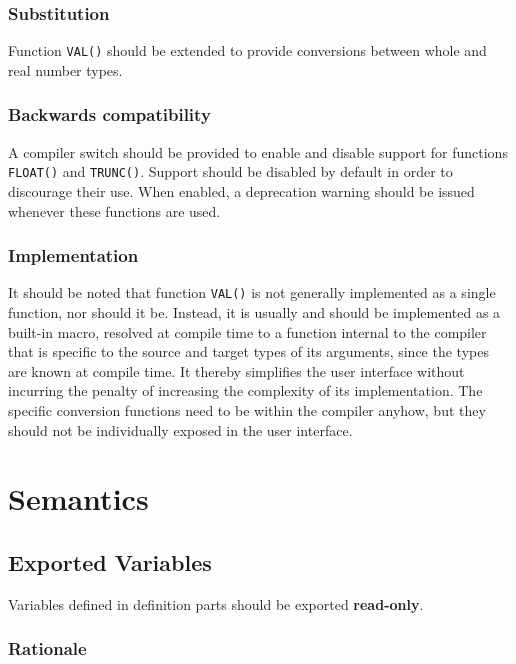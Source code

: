 \documentclass[10pt,a4paper]{article} %
\begin{document}
\subsubsection{Substitution}

Function \verb|VAL()| should be extended to provide conversions between whole and real number types.

\subsubsection{Backwards compatibility}

A compiler switch should be provided to enable and disable support for functions \verb|FLOAT()| and \verb|TRUNC()|. Support should be disabled by default in order to discourage their use. When enabled, a deprecation warning should be issued whenever these functions are used.

\subsubsection{Implementation}
It should be noted that function \verb|VAL()| is not generally implemented as a single function, nor should it be. Instead, it is usually and should be implemented as a built-in macro, resolved at compile time to a function internal to the compiler that is specific to the source and target types of its arguments, since the types are known at compile time. It thereby simplifies the user interface without incurring the penalty of increasing the complexity of its implementation. The specific conversion functions need to be within the compiler anyhow, but they should not be individually exposed in the user interface.


\section{Semantics}

\subsection{Exported Variables}

Variables defined in definition parts should be exported \textbf{read-only}. 

\subsubsection{Rationale}
\end{document}
